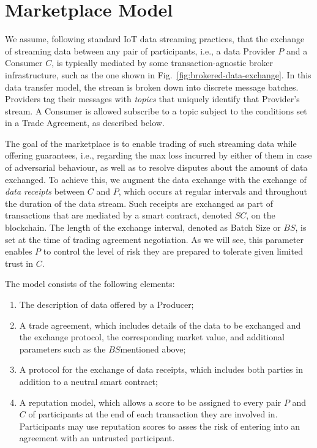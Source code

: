 \documentclass[letterpaper, 10 pt, conference]{ieeeconf}  %
\newcommand{\bs}{\ensuremath{\mathit{BS}}}
\newcommand{\smartc}{\ensuremath{\mathit{SC}}}
\begin{document}
\section{Marketplace Model} \label{sec:MKModel}

We assume, following standard IoT data streaming practices, that the exchange of streaming data between any pair of  participants, i.e., a data Provider  $P$ and a Consumer $C$, is typically mediated by some transaction-agnostic broker infrastructure, such as the one shown in Fig.~\ref{fig:brokered-data-exchange}.
In this data transfer model, the stream is broken down into discrete message batches. Providers tag their messages with \textit{topics} that uniquely identify that Provider's stream. 
A Consumer is allowed subscribe to a topic subject to the conditions set in a Trade Agreement, as described below.

The goal of the marketplace is to enable trading of such streaming data while offering guarantees, i.e., 
regarding the max  loss incurred by either of them in case of adversarial behaviour, as well as to resolve disputes about the amount of data exchanged.
%
To achieve this, we augment the data exchange with the exchange of \textit{data receipts} between $C$ and $P$, which occurs at regular intervals and throughout the duration of the data stream. Such receipts are exchanged as part of transactions that are mediated by a smart contract, denoted \smartc, on the blockchain. 
The length of the exchange interval, denoted as Batch Size or \bs, is set at the time of trading agreement negotiation. 
As we will see, this parameter enables  $P$ to control the level of risk they are prepared to tolerate given limited trust in $C$.

The model consists of the following elements:
\begin{enumerate}
	
	\item The description of data offered by a Producer;
	
	\item A trade agreement, which includes details of the data to be exchanged and the exchange protocol, the corresponding market value, and additional parameters such as the \bs mentioned above;
	
	\item A protocol for the exchange of data receipts, which includes both parties in addition to a neutral smart contract;
	
	\item A reputation model, which allows a score to be assigned to every pair $P$ and $C$ of participants at the end of each transaction they are involved in. 
	Participants may use reputation scores to asses the risk of entering into an agreement with an untrusted participant.

\end{enumerate}
\end{document}
